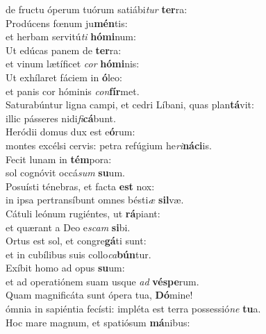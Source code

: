 \evenverse de fructu óperum tuórum satiábi\textit{tur} \textbf{ter}ra:\\
\oddverse Prodúcens fœnum ju\textbf{mén}tis:~\*\\
\oddverse et herbam servitú\textit{ti} \textbf{hó}\textbf{mi}num:\\
\evenverse Ut edúcas panem de \textbf{ter}ra:~\*\\
\evenverse et vinum lætíficet \textit{cor} \textbf{hó}\textbf{mi}nis:\\
\oddverse Ut exhílaret fáciem in \textbf{ó}leo:~\*\\
\oddverse et panis cor hóminis \textit{con}\textbf{fír}met.\\
\evenverse Saturabúntur ligna campi, et cedri Líbani, quas plan\textbf{tá}vit:~\*\\
\evenverse illic pásseres nidi\textit{fi}\textbf{cá}bunt.\\
\oddverse Heródii domus dux est e\textbf{ó}rum:~\*\\
\oddverse montes excélsi cervis: petra refúgium he\textit{ri}\textbf{ná}\textbf{ci}is.\\
\evenverse Fecit lunam in \textbf{tém}pora:~\*\\
\evenverse sol cognóvit occá\textit{sum} \textbf{su}um.\\
\oddverse Posuísti ténebras, et facta \textbf{est} nox:~\*\\
\oddverse in ipsa pertransíbunt omnes bésti\textit{æ} \textbf{sil}væ.\\
\evenverse Cátuli leónum rugiéntes, ut \textbf{rá}piant:~\*\\
\evenverse et quærant a Deo e\textit{scam} \textbf{si}bi.\\
\oddverse Ortus est sol, et congre\textbf{gá}ti sunt:~\*\\
\oddverse et in cubílibus suis collo\textit{ca}\textbf{bún}tur.\\
\evenverse Exíbit homo ad opus \textbf{su}um:~\*\\
\evenverse et ad operatiónem suam usque \textit{ad} \textbf{vé}\textbf{spe}rum.\\
\oddverse Quam magnificáta sunt ópera tua, \textbf{Dó}mine!~\*\\
\oddverse ómnia in sapiéntia fecísti: impléta est terra possessió\textit{ne} \textbf{tu}a.\\
\evenverse Hoc mare magnum, et spatiósum \textbf{má}nibus:~\*\\
